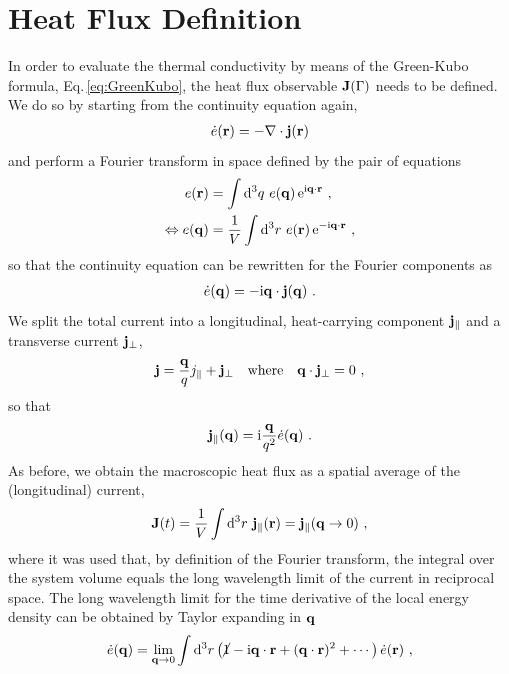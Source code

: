 \section{Heat Flux Definition}
In order to evaluate the thermal conductivity by means of the Green-Kubo formula, Eq.\,\eqref{eq:GreenKubo}, the  heat flux observable ${\bf J} (\Gamma)$ needs to be defined. We do so by starting from the continuity equation again,
\begin{align}
	\dot{e} (\b r) = - \b \nabla \cdot \b j (\b r)
	\label{eq:hf.cont}
\end{align}
and perform a Fourier transform in space defined by the pair of equations
\begin{align}
	e(\b r) 
		&= \int \d^3 q ~ e(\b q) \, {\rm e}^{\im \b q \cdot \b r} ~,
		\label{eq:hf.ft.r} \\
	\Leftrightarrow
	e(\b q) 
		&= \frac{1}{V} \int \d^3 r ~ e(\b r) \, {\rm e}^{-\im \b q \cdot \b r} ~,
	\label{eq:hf.ft.2}
\end{align}
so that the continuity equation can be rewritten for the Fourier components as
\begin{align}
	\dot{e} (\b q)
		= - \im \b q \cdot \b j (\b q)~.
	\label{eq:hf.ft.cont.q}
\end{align}
We split the total current into a longitudinal, heat-carrying component ${\bf j}_{\parallel}$ and a transverse current ${\bf j}_{\perp}$,
\begin{align}
	{\bf j} = \frac{{\bf q}}{q} j_{\parallel} + {\bf j}_{\perp} \quad\text{where}\quad {\bf q} \cdot {\bf j}_{\perp} = 0~,
\end{align}
so that
\begin{align}
	\b j_{\parallel} (\b q)
		= \im \frac{\b q}{q^2} \dot{e} (\b q)~.
  \label{eq:hf.j.parallel}
\end{align}
As before, we obtain the macroscopic heat flux as a spatial average of the (longitudinal) current,
\begin{align}
	\b J (t) = \frac{1}{V} \int \d^3 r ~ \b j_{\parallel} (\b r) = \b j_{\parallel} (\b q \to 0)~,
	\label{eq:hf.J.1}
\end{align}
where it was used that, by definition of the Fourier transform, the integral over the system volume equals the long wavelength limit of the current in reciprocal space. The long wavelength limit for the time derivative of the local energy density can be obtained by Taylor expanding in ${\bf q}$
\begin{align}
	\dot{e} (\b q) 
		= \lim_{\b q \to 0} \int \d^3 r \left(\cancel{1} - \im \b q \cdot \b r + (\b q \cdot \b r)^2 + \cdots \right) \dot{e} (\b r)~,
	\label{eq:hf.e.lw}
\end{align}
